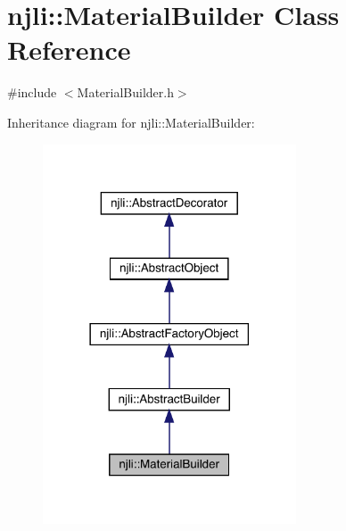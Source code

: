 \hypertarget{classnjli_1_1_material_builder}{}\section{njli\+:\+:Material\+Builder Class Reference}
\label{classnjli_1_1_material_builder}


{\ttfamily \#include $<$Material\+Builder.\+h$>$}



Inheritance diagram for njli\+:\+:Material\+Builder\+:\nopagebreak
\begin{figure}[H]
\begin{center}
\leavevmode
\includegraphics[width=213pt]{classnjli_1_1_material_builder__inherit__graph}
\end{center}
\end{figure}



